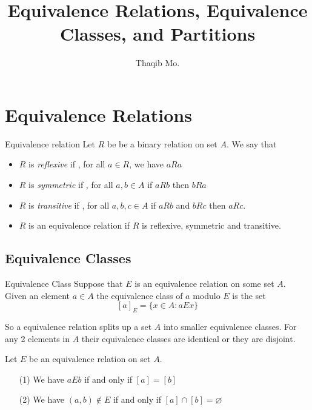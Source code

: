 \documentclass[16pt,a4paper]{article}
\author{Thaqib Mo.}
\title{ Equivalence Relations, Equivalence Classes, and Partitions }
\theoremstyle{definition}
\begin{document}
\maketitle
\newpage
\section{Equivalence Relations}

\begin{defn}{Equivalence relation}{}
Let $R$ be be a binary relation on set $A$.  We say that 
\begin{itemize}
\item $R$ is \textit{reflexive} if , for all $a\in R$, we have $aRa$
\item $R$ is \textit{symmetric} if , for all $a,b \in A$  if $aRb$ then $bRa$
\item $R$ is \textit{transitive} if , for all $a,b,c \in A$ if $aRb$ and $bRc$ then $aRc$. 
\item $R$ is an equivalence relation if $R$ is reflexive, symmetric and transitive. 
\end{itemize}
\end{defn}

\subsection{Equivalence Classes}
\begin{defn}{Equivalence Class}{}
Suppose that $E$ is an equivalence relation on some set $A$. Given an element $a\in A$ the equivalence class of $a$ modulo $E$ is the set
\[[a]_E = \{x\in A : aEx\}\]
\end{defn}
So a equivalence relation splits up a set $A$ into smaller equivalence classes.  For any 2 elements in $A$ their equivalence classes are identical or they are disjoint. 
\begin{thm}{}{}
Let $E$ be an equivalence relation on set $A$. 
\begin{itemize}
\item[(1)] We have $aEb$ if and only if $[a] = [b]$
\item[(2)] We have $(a,b) \notin E$ if and only if $[a]\cap [b] = \varnothing$
\end{itemize}
\end{thm}
\end{document}
